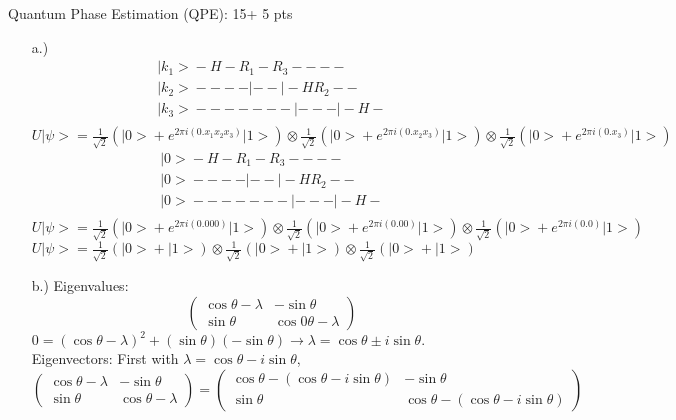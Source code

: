 \documentclass[12pt]{article}
\makeatletter
\newcommand{\<}{\langle}
\renewcommand{\>}{\rangle}
\newenvironment{problem}{\@startsection
       {section}
       {1}
       {-.2em}
       {-3.5ex plus -1ex minus -.2ex}
       {2.3ex plus .2ex}
       {\pagebreak[3]
       \large\bf\noindent{Problem }
       }
       }
       {%
       \begin{center}\large\bf \end{center}}
\def\ket#1{\big|{#1}\big>}
\makeatother
\begin{document}
\begin{problem}{Quantum Phase Estimation (QPE): 15+ 5 pts}
\begin{enumerate}
\item[a.)]
$$
\begin{array}{cccc}
\ket{k_1} -H-R_1-R_3----\\
\ket{k_2} ----|--|-HR_2--\\
\ket{k_3} -------|---|-H-\\
\end{array}
$$
$U\ket{\psi} = \frac{1}{\sqrt{2}}(\ket{0} + e^{2\pi i (0.x_1x_2x_3)}\ket{1}) \otimes \frac{1}{\sqrt{2}}(\ket{0} + e^{2\pi i (0.x_2x_3)}\ket{1}) \otimes \frac{1}{\sqrt{2}}(\ket{0} + e^{2\pi i (0.x_3)}\ket{1})$
$$
\begin{array}{cccc}
\ket{0} -H-R_1-R_3----\\
\ket{0} ----|--|-HR_2--\\
\ket{0} -------|---|-H-\\
\end{array}
$$
$U\ket{\psi} = \frac{1}{\sqrt{2}}(\ket{0} + e^{2\pi i (0.000)}\ket{1}) \otimes \frac{1}{\sqrt{2}}(\ket{0} + e^{2\pi i (0.00)}\ket{1}) \otimes \frac{1}{\sqrt{2}}(\ket{0} + e^{2\pi i (0.0)}\ket{1})$
$U\ket{\psi} = \frac{1}{\sqrt{2}}(\ket{0} + \ket{1}) \otimes \frac{1}{\sqrt{2}}(\ket{0} + \ket{1}) \otimes \frac{1}{\sqrt{2}}(\ket{0} + \ket{1})$

\item[b.)] Eigenvalues: $$\left(\begin{array}{cc}
		\cos \theta -\lambda & -\sin \theta\\
		\sin \theta & \cos 0\theta - \lambda	
		\end{array}
      \right) $$
      $0 = (\cos\theta - \lambda)^2+(\sin \theta)(-\sin \theta) \rightarrow \lambda = \cos\theta \pm i\sin\theta.$\\
      
      Eigenvectors: First with $\lambda = \cos\theta - i\sin\theta$, 
      	$$\left(\begin{array}{cc}
		\cos \theta -\lambda & -\sin \theta\\
		\sin \theta & \cos \theta - \lambda	
		\end{array}
      \right)  =  \left(\begin{array}{cc}
		\cos \theta -(\cos\theta - i\sin\theta) & -\sin \theta\\
		\sin \theta & \cos \theta - (\cos\theta - i\sin\theta)	
		\end{array}
      \right)$$
      

\end{enumerate}
\end{problem}
\end{document}
